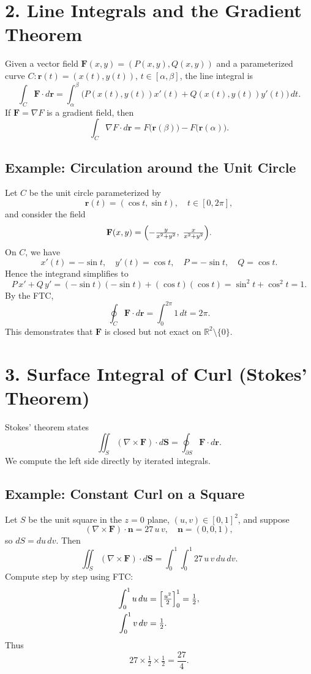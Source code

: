 \documentclass[11pt]{article}
\begin{document}
	\section{2. Line Integrals and the Gradient Theorem}
	Given a vector field $\mathbf{F}(x,y)=(P(x,y),Q(x,y))$ and a parameterized curve $C: \mathbf{r}(t)=(x(t),y(t))$, $t\in[\alpha,\beta]$, the line integral is
	\[
	\int_{C}\mathbf{F}\cdot d\mathbf{r} = \int_{\alpha}^{\beta}\bigl(P(x(t),y(t))x'(t) + Q(x(t),y(t))y'(t)\bigr)\,dt.
	\]
	If $\mathbf{F}=\nabla F$ is a gradient field, then
	\[
	\int_{C}\nabla F\cdot d\mathbf{r} = F\bigl(\mathbf{r}(\beta)\bigr) - F\bigl(\mathbf{r}(\alpha)\bigr).
	\]
	
	\subsection*{Example: Circulation around the Unit Circle}
	Let $C$ be the unit circle parameterized by
	\[
	\mathbf{r}(t) = (\cos t,\sin t), \quad t\in[0,2\pi],
	\]
	and consider the field
	\[
	\mathbf{F}(x,y) = \Bigl(-\tfrac{y}{x^2+y^2},\;\tfrac{x}{x^2+y^2}\Bigr).
	\]
	On $C$, we have
	\[
	x'(t)=-\sin t, \quad y'(t)=\cos t, \quad P=-\sin t, \quad Q=\cos t.
	\]
	Hence the integrand simplifies to
	\[
	P\,x' + Q\,y' = (-\sin t)(-\sin t)+(\cos t)(\cos t)=\sin^2t+\cos^2t=1.
	\]
	By the FTC,
	\[
	\oint_{C}\mathbf{F}\cdot d\mathbf{r} = \int_{0}^{2\pi}1\,dt = 2\pi.
	\]
	This demonstrates that $\mathbf{F}$ is closed but not exact on $\mathbb{R}^2\setminus\{0\}$.
	
	\section{3. Surface Integral of Curl (Stokes' Theorem)}
	Stokes' theorem states
	\[
	\iint_{S}(\nabla\times\mathbf{F})\cdot d\mathbf{S} = \oint_{\partial S}\mathbf{F}\cdot d\mathbf{r}.
	\]
	We compute the left side directly by iterated integrals.
	
	\subsection*{Example: Constant Curl on a Square}
	Let $S$ be the unit square in the $z=0$ plane, $(u,v)\in[0,1]^2$, and suppose
	\[
	(\nabla\times\mathbf{F})\cdot\mathbf{n} = 27\,u\,v,
	\quad \mathbf{n}=(0,0,1),
	\]
	so $dS=du\,dv$.  Then
	\[
	\iint_{S}(\nabla\times\mathbf{F})\cdot d\mathbf{S} = \int_{0}^{1}\int_{0}^{1}27\,u\,v\,du\,dv.
	\]
	Compute step by step using FTC:
	\begin{align*}
		\int_{0}^{1}u\,du &= \Bigl[\tfrac{u^2}{2}\Bigr]_{0}^{1}=\tfrac12,\\%
		\int_{0}^{1}v\,dv &= \tfrac12.
	\end{align*}
	Thus
	\[
	27\times\tfrac12\times\tfrac12 = \frac{27}{4}.
	\]
	
\end{document}
